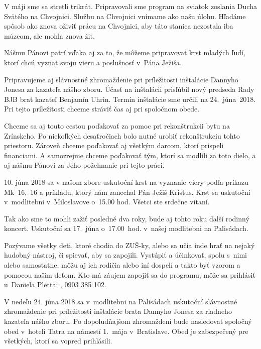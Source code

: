 V máji sme sa stretli trikrát. Pripravovali sme program na sviatok zoslania Ducha Svätého na Chvojnici. Službu na Chvojnici vnímame ako našu úlohu. Hľadáme spôsob ako znova oživiť prácu na Chvojnici, aby táto stanica nezostala iba múzeom, ale mohla znova žiť.

Nášmu Pánovi patrí vďaka aj za to, že môžeme pripravovať krst mladých ľudí, ktorí chcú vyznať svoju vieru a poslušnosť v~Pána Ježiša.

Pripravujeme aj slávnostné zhromaždenie pri príležitosti inštalácie Dannyho Jonesa za kazateľa nášho zboru. Účasť na inštalácii prisľúbil nový predseda Rady BJB brat kazateľ Benjamín Uhrin. Termín inštalácie sme určili na 24.~júna~2018. Pri tejto príležitosti chceme stráviť čas aj pri spoločnom obede.

Chceme sa aj touto cestou poďakovať za pomoc pri rekonštrukcii bytu na Zrínskeho. Po niekoľkých desaťročiach bolo nutné urobiť rekonštrukciu tohto priestoru. Zároveň chceme poďakovať aj všetkým darcom, ktorí prispeli financiami. A samozrejme chceme poďakovať tým, ktorí sa modlili za toto dielo, a aj nášmu Pánovi za Jeho požehnanie pri tejto práci.



10. júna 2018 sa v našom zbore uskutoční krst na vyznanie viery podľa príkazu Mk~16,~16 a príkladu, ktorý nám zanechal Pán Ježiš Kristus. Krst sa uskutoční v~modlitebni v~Miloslavove o~15.00 hod. Všetci ste srdečne vítaní.


Tak ako sme to mohli zažiť posledné dva roky, bude aj tohto roku ďalší rodinný koncert. Uskutoční sa 17.~júna o~17.00~hod. v~našej modlitebni na Palisádach.

Pozývame všetky deti, ktoré chodia do ZUŠ-ky, alebo sa učia inde hrať na nejaký hudobný nástroj, či spievať, aby sa zapojili. Vystúpiť a účinkovať, spolu s~nimi alebo samostatne, môžu aj ich rodičia alebo iní dospelí a takto byť vzorom a pomocou našim deťom. Kto má záujem zapojiť sa do programu, môže sa prihlásiť u~Daniela Pletta: , 0903 385 102.


V nedeľu 24. júna 2018 sa v~modlitebni na Palisádach uskutoční slávnostné zhromaždenie pri príležitosti inštalácie brata Dannyho Jonesa za riadneho kazateľa nášho zboru. Po dopoludňajšom zhromaždení bude nasledovať spoločný obed v~hoteli Tatra na námestí 1.~mája v~Bratislave. Obed je zabezpečený pre všetkých, ktorí sa vopred prihlásili.


